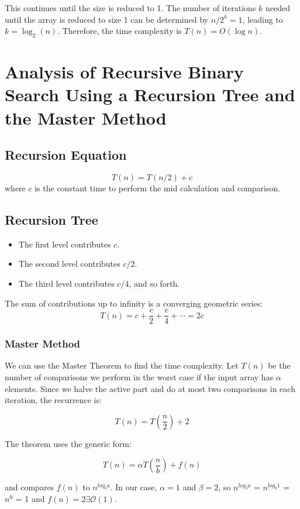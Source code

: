 \documentclass{article}
\begin{document}
This continues until the size is reduced to 1. The number of iterations \( k \) needed until the array is reduced to size 1 can be determined by \( n / 2^k = 1 \), leading to \( k = \log_2(n) \). Therefore, the time complexity is \( T(n) = O(\log n) \).

\section{Analysis of Recursive Binary Search Using a Recursion Tree and the Master Method}
\subsection{Recursion Equation}
\[ T(n) = T(n/2) + c \]
where \( c \) is the constant time to perform the mid calculation and comparison.

\subsection{Recursion Tree}
\begin{itemize}
    \item The first level contributes \( c \).
    \item The second level contributes \( c/2 \).
    \item The third level contributes \( c/4 \), and so forth.
\end{itemize}

The sum of contributions up to infinity is a converging geometric series:
\[ T(n) = c + \frac{c}{2} + \frac{c}{4} + \cdots = 2c \]

\subsubsection{Master Method\cite{WinNT}}
We can use the Master Theorem to find the time complexity. Let $T(n)$ be the number of comparisons we perform in the worst case if the input array has $\alpha$ elements. Since we halve the active part and do at most two comparisons in each iteration, the recurrence is:

$$T(n) = T(\frac{n}{2}) + 2$$

The theorem uses the generic form:

$$T(n) = \alpha T(\frac{n}{b}) + f(n)$$

and compares $f(n)$ to $n^{log_b a}$. In our case, $\alpha = 1$ and $\beta = 2$, so $n^{log_b a}$ = $n^{log_b 1}$ = $n^0$ = 1 and $f(n) = 2\exists \mathcal{O}(1)$.
\end{document}
